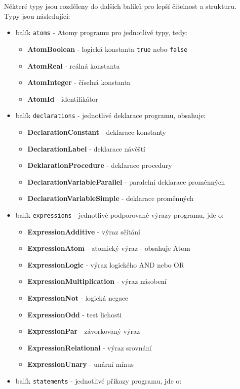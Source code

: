 \documentclass[
12pt,
a4paper,
pdftex,
czech,
titlepage
]{report}
\begin{document}
 Některé typy jsou rozděleny do dalších balíků pro lepší čitelnost a strukturu.
 Typy jsou následující:
 \begin{itemize}
 \item balík \texttt{atoms} - Atomy programu pro jednotlivé typy, tedy:
 	\begin{itemize}
 	\item \textbf{AtomBoolean} - logická konstanta \texttt{true} nebo \texttt{false}
 	\item \textbf{AtomReal} - reálná konstanta
 	\item \textbf{AtomInteger} - číselná konstanta
 	\item \textbf{AtomId} - identifikátor
 	\end{itemize}
\item balík \texttt{declarations} - jednotlivé deklarace programu, obsahuje:
	\begin{itemize}
	\item \textbf{DeclarationConstant} - deklarace konstanty
	\item \textbf{DeclarationLabel} - deklarace návěští
	\item \textbf{DeklarationProcedure} - deklarace procedury
	\item \textbf{DeclarationVariableParallel} - paralelní deklarace proměnných
	\item \textbf{DeclarationVariableSimple} - deklarace proměnných
	\end{itemize}	
\item balík \texttt{expressions} - jednotlivé podporované výrazy programu, jde o:
	\begin{itemize}
	\item \textbf{ExpressionAdditive} - výraz sčítání
	\item \textbf{ExpressionAtom} - atomický výraz - obsahuje Atom
	\item \textbf{ExpressionLogic} - výraz logického AND nebo OR
	\item \textbf{ExpressionMultiplication} - výraz násobení
	\item \textbf{ExpressionNot} - logická negace
	\item \textbf{ExpressionOdd} - test lichosti
	\item \textbf{ExpressionPar} - závorkovaný výraz
	\item \textbf{ExpressionRelational} - výraz srovnání
	\item \textbf{ExpressionUnary} - unární mínus
	\end{itemize}
\item balík \texttt{statements} - jednotlivé příkazy programu, jde o:

\end{itemize}
\end{document}
